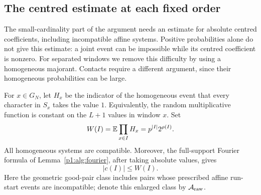 \subsection{The centred estimate at each fixed order}

The small-cardinality part of the argument needs an estimate for absolute
centred coefficients, including incompatible affine systems. Positive
probabilities alone do not give this estimate: a joint event can be
impossible while its centred coefficient is nonzero. For separated windows
we remove this difficulty by using a homogeneous majorant. Contacts require
a different argument, since their homogeneous probabilities can be large.

For $x\in G_N$, let $H_x$ be the indicator of the homogeneous event that
every character in $S_x$ takes the value $1$. Equivalently, the random
multiplicative function is constant on the $L+1$ values in window $x$. Set
\begin{equation}
 W(I)=\mathbb E\prod_{x\in I}H_x
      =p^{|I|}2^{\rho(I)}.
 \label{p1:core:homogeneous-weight}
\end{equation}
All homogeneous systems are compatible. Moreover, the full-support Fourier
formula of Lemma~\ref{p1:alg:fourier}, after taking absolute values, gives
\begin{equation}
 |c(I)|\le W(I).
 \label{p1:core:homogeneous-majorant}
\end{equation}
Here the geometric good-pair class includes pairs whose prescribed affine
run-start events are incompatible; denote this enlarged class by
$\mathcal A_{\rm raw}$.

